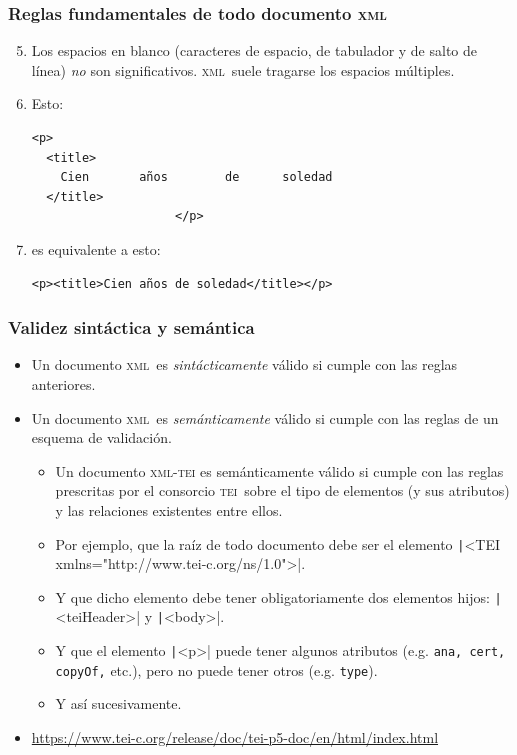 \documentclass[%
  handout, %
  ]{beamer}
\newcommand*{\azul}[1]{\textcolor{bluenivaca}{#1}}
\newcommand*{\TEI}{\textsc{tei}}
\newcommand*{\XML}{\textsc{xml}}
\begin{document}
\begin{frame}[fragile]
  \frametitle{Reglas fundamentales de todo documento \XML}
  \begin{enumerate}
      \setcounter{enumi}{4}
    \item Los espacios en blanco (caracteres de espacio, de tabulador y de salto de línea) \textit{no} son significativos. \XML\ suele tragarse los espacios múltiples.

      \medskip
      
    \item[] Esto:
\begin{verbatim}
<p>
  <title>
    Cien       años        de      soledad
  </title>
                    </p>
\end{verbatim}

      \bigskip

    \item[] es equivalente a esto:
\small
\begin{verbatim}
<p><title>Cien años de soledad</title></p>
\end{verbatim}      

      
  \end{enumerate}
\end{frame}


\begin{frame}[fragile]
  \frametitle{Validez sintáctica y semántica}
  \begin{itemize}
    \item Un documento \XML\ es \textit{sintácticamente} válido si cumple con las reglas anteriores.
    \item Un documento \XML\ es \textit{semánticamente} válido si cumple con las reglas de un esquema de validación.
      
      \begin{itemize}
        \item Un documento \azul{\XML-\TEI} es semánticamente válido si cumple con las reglas prescritas por el consorcio \TEI\ sobre el tipo de elementos (y sus atributos) y las relaciones existentes entre ellos.
        \item Por ejemplo, que la raíz de todo documento debe ser el elemento \texttt|<TEI xmlns="http://www.tei-c.org/ns/1.0">|.
        \item Y que dicho elemento debe tener obligatoriamente dos elementos hijos: \texttt|<teiHeader>| y \texttt|<body>|.
        \item Y que el elemento \texttt|<p>| puede tener algunos atributos (e.g. \texttt{ana, cert, copyOf,} etc.), pero no puede tener otros (e.g. \texttt{type}).
        \item Y así sucesivamente.
      \end{itemize}
      
    \item[] \url{https://www.tei-c.org/release/doc/tei-p5-doc/en/html/index.html}
  \end{itemize}
\end{frame}
\end{document}
